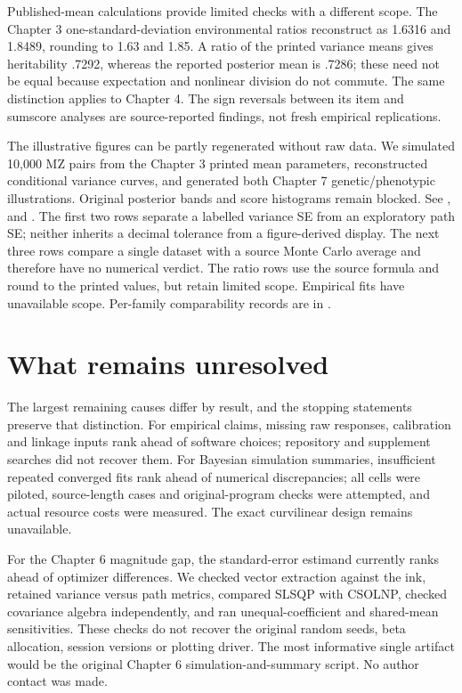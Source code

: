 Published-mean calculations provide limited checks with a different scope. The Chapter 3 one-standard-deviation environmental ratios reconstruct as 1.6316 and 1.8489, rounding to 1.63 and 1.85. A ratio of the printed variance means gives heritability .7292, whereas the reported posterior mean is .7286; these need not be equal because expectation and nonlinear division do not commute. The same distinction applies to Chapter 4. The sign reversals between its item and sumscore analyses are source-reported findings, not fresh empirical replications.

The illustrative figures can be partly regenerated without raw data. We simulated 10,000 MZ pairs from the Chapter 3 printed mean parameters, reconstructed conditional variance curves, and generated both Chapter 7 genetic/phenotypic illustrations. Original posterior bands and score histograms remain blocked. See ,  and .
{\small}
The first two rows separate a labelled variance SE from an exploratory path SE; neither inherits a decimal tolerance from a figure-derived display. The next three rows compare a single dataset with a source Monte Carlo average and therefore have no numerical verdict. The ratio rows use the source formula and round to the printed values, but retain limited scope. Empirical fits have unavailable scope. Per-family comparability records are in .

\section{What remains unresolved}
The largest remaining causes differ by result, and the stopping statements preserve that distinction. For empirical claims, missing raw responses, calibration and linkage inputs rank ahead of software choices; repository and supplement searches did not recover them. For Bayesian simulation summaries, insufficient repeated converged fits rank ahead of numerical discrepancies; all cells were piloted, source-length cases and original-program checks were attempted, and actual resource costs were measured. The exact curvilinear design remains unavailable.

For the Chapter 6 magnitude gap, the standard-error estimand currently ranks ahead of optimizer differences. We checked vector extraction against the ink, retained variance versus path metrics, compared SLSQP with CSOLNP, checked covariance algebra independently, and ran unequal-coefficient and shared-mean sensitivities. These checks do not recover the original random seeds, beta allocation, session versions or plotting driver. The most informative single artifact would be the original Chapter 6 simulation-and-summary script. No author contact was made.

